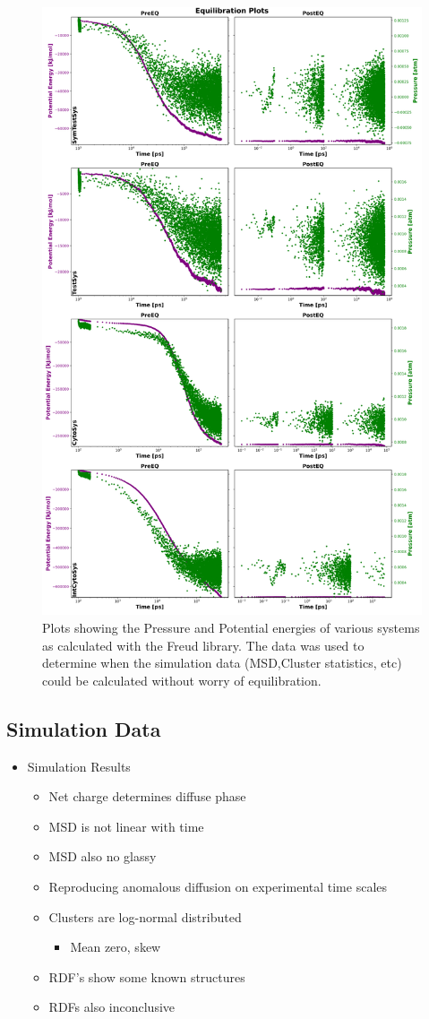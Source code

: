 \documentclass[a4paper,11pt,oneside]{book}
\begin{document}
\begin{figure}[!htbp]
\centering
\includegraphics[width=0.7\linewidth]{files/Fig3-c8f52112ab9c36b95917d32f74d7df9b.png}
\caption[]{Plots showing the Pressure and Potential energies of various systems as calculated with the Freud library. The data was used to determine when the simulation data (MSD,Cluster statistics, etc) could be calculated without worry of equilibration.}
\label{Fig3_EQ}
\end{figure}

\subsection{Simulation Data}

\begin{itemize}
\item Simulation Results\begin{itemize}
\item Net charge determines diffuse phase
\item MSD is not linear with time
\item MSD also no glassy
\item Reproducing anomalous diffusion on experimental time scales
\item Clusters are log-normal distributed\begin{itemize}
\item Mean zero, skew
\end{itemize}


\item RDF's show some known structures
\item RDFs also inconclusive
\end{itemize}
\end{itemize}
\end{document}
